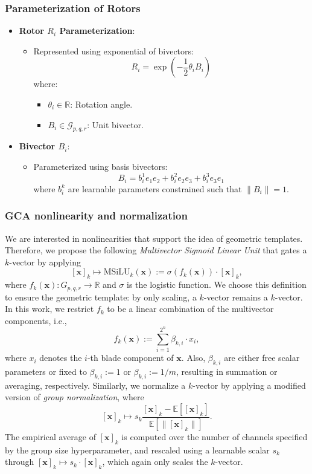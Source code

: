 \documentclass[a4paper,14pt]{article}
\theoremstyle{plain} %
\theoremstyle{definition} %
\theoremstyle{remark} %
\theoremstyle{definition}
\theoremstyle{remark}
\theoremstyle{remark}
\begin{document}
	\subsubsection{Parameterization of Rotors}
	
	\begin{itemize}
		\item \textbf{Rotor \( R_i \) Parameterization}:
		\begin{itemize}
			\item Represented using exponential of bivectors:
			\[
			R_i = \exp\left( -\frac{1}{2} \theta_i B_i \right)
			\]
			where:
			\begin{itemize}
				\item \( \theta_i \in \mathbb{R} \): Rotation angle.
				\item \( B_i \in \mathcal{G}_{p,q,r} \): Unit bivector.
			\end{itemize}
		\end{itemize}
		\item \textbf{Bivector \( B_i \)}:
		\begin{itemize}
			\item Parameterized using basis bivectors:
			\[
			B_i = b_i^1 e_1 e_2 + b_i^2 e_2 e_3 + b_i^3 e_3 e_1
			\]
			where \( b_i^k \) are learnable parameters constrained such that \( \| B_i \| = 1 \).
		\end{itemize}
	\end{itemize}
	
	\subsubsection{GCA nonlinearity and normalization}
	
	We are interested in nonlinearities that support the idea of geometric templates. Therefore, we propose the following \textit{Multivector Sigmoid Linear Unit} that gates  a $k$-vector by applying
	\[
	[\mathbf{x}]_k \mapsto \text{MSiLU}_k(\mathbf{x}) := \sigma(f_k(\mathbf{x})) \cdot [\mathbf{x}]_k,
	\]
	where $f_k(\mathbf{x}) : G_{p,q,r} \rightarrow \mathbb{R}$ and $\sigma$ is the logistic function. We choose this definition to ensure the geometric template: by only scaling, a $k$-vector remains a $k$-vector. In this work, we restrict $f_k$ to be a linear combination of the multivector components, i.e.,
	\[
	f_k(\mathbf{x}) := \sum_{i=1}^{2^n} \beta_{k,i} \cdot x_i,
	\]
	where $x_i$ denotes the $i$-th blade component of $\mathbf{x}$. Also, $\beta_{k,i}$ are either free scalar parameters or fixed to $\beta_{k,i} := 1$ or $\beta_{k,i} := 1/m$, resulting in summation or averaging, respectively. Similarly, we normalize a $k$-vector by applying a modified version of \textit{group normalization}, where
	\[
	[\mathbf{x}]_k \mapsto s_k \frac{[\mathbf{x}]_k - \mathbb{E}[[\mathbf{x}]_k]}{\mathbb{E}[\|[\mathbf{x}]_k\|]}.
	\]
	The empirical average of $[\mathbf{x}]_k$ is computed over the number of channels specified by the group size hyperparameter, and rescaled using a learnable scalar $s_k$ through $[\mathbf{x}]_k \mapsto s_k \cdot [\mathbf{x}]_k$, which again only scales the $k$-vector.
	
\end{document}
